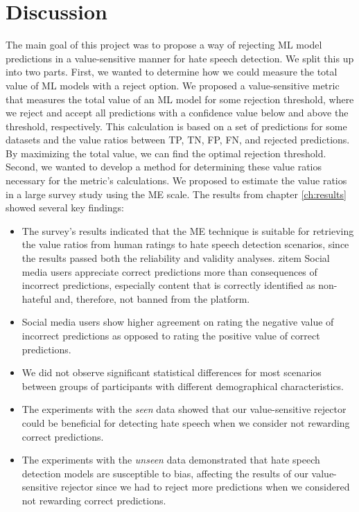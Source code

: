 \chapter{Discussion}
The main goal of this project was to propose a way of rejecting ML model predictions in a value-sensitive manner for hate speech detection.
%
We split this up into two parts.
%
First, we wanted to determine how we could measure the total value of ML models with a reject option.
%
We proposed a value-sensitive metric that measures the total value of an ML model for some rejection threshold, where we reject and accept all predictions with a confidence value below and above the threshold, respectively.
%
This calculation is based on a set of predictions for some datasets and the value ratios between TP, TN, FP, FN, and rejected predictions.
%
By maximizing the total value, we can find the optimal rejection threshold.
%
Second, we wanted to develop a method for determining these value ratios necessary for the metric's calculations.
%
We proposed to estimate the value ratios in a large survey study using the ME scale.
%
The results from chapter \ref{ch:results} showed several key findings:
\begin{itemize}
    \item The survey's results indicated that the ME technique is suitable for retrieving the value ratios from human ratings to hate speech detection scenarios, since the results passed both the reliability and validity analyses.
          zitem Social media users appreciate correct predictions more than consequences of incorrect predictions, especially content that is correctly identified as non-hateful and, therefore, not banned from the platform.
    \item Social media users show higher agreement on rating the negative value of incorrect predictions as opposed to rating the positive value of correct predictions.
    \item We did not observe significant statistical differences for most scenarios between groups of participants with different demographical characteristics.
    \item The experiments with the \emph{seen} data showed that our value-sensitive rejector could be beneficial for detecting hate speech when we consider not rewarding correct predictions.
    \item The experiments with the \emph{unseen} data demonstrated that hate speech detection models are susceptible to bias, affecting the results of our value-sensitive rejector since we had to reject more predictions when we considered not rewarding correct predictions.
\end{itemize}
%

